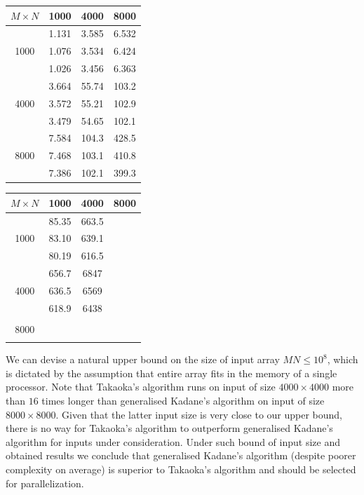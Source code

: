 \begin{minipage}[h]{0.47\textwidth}
\centering
\begin{tabular}{c|c|c|c|}
$M \times N$ & 1000 & 4000 & 8000 \\
\hline
 & 1.131 & 3.585 & 6.532 \\
1000 & 1.076 & 3.534 & 6.424 \\
 & 1.026 & 3.456 & 6.363 \\
\hline
 & 3.664 & 55.74 & 103.2 \\
4000 & 3.572 & 55.21 & 102.9 \\
 & 3.479 & 54.65 & 102.1 \\
\hline
 & 7.584 & 104.3 & 428.5 \\
8000 & 7.468 & 103.1 & 410.8 \\
 & 7.386 & 102.1 & 399.3 \\
\hline
\end{tabular}
\end{minipage}
\hfill
\begin{minipage}[h]{0.47\textwidth}
\centering
\begin{tabular}{c|c|c|c|}
$M \times N$ & 1000 & 4000 & 8000 \\
\hline
 & 85.35 & 663.5 & \\
1000 & 83.10 & 639.1 & \\
 & 80.19 & 616.5 & \\
\hline
 & 656.7 & 6847 & \\
4000 & 636.5 & 6569 & \\
 & 618.9 & 6438 & \\
\hline
 &  &  & \\
8000 &  &  & \\
 &  &  & \\
\hline
\end{tabular}
\end{minipage}
\vspace{1em}

We can devise a natural upper bound on the size of input array $MN \leq 10^8$, which is dictated by the assumption that entire array fits in the memory of a single processor.
Note that Takaoka's algorithm runs on input of size $4000 \times 4000$ more than $16$ times longer than generalised Kadane's algorithm on input of size $8000 \times 8000$.
Given that the latter input size is very close to our upper bound, there is no way for Takaoka's algorithm to outperform generalised Kadane's algorithm for inputs under consideration.
Under such bound of input size and obtained results we conclude that generalised Kadane's algorithm (despite poorer complexity on average) is superior to Takaoka's algorithm and should be selected for parallelization.

